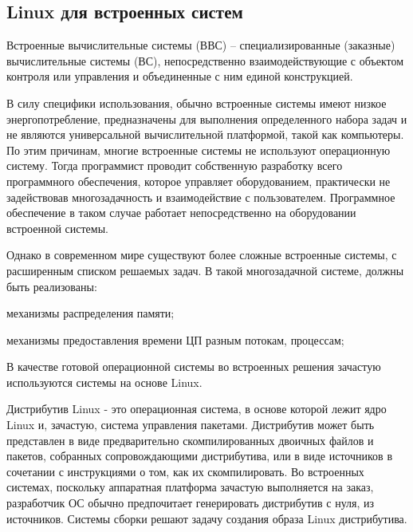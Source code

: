 \subsection{Linux для встроенных систем}
\label{subsec:linux-for-embedded-systems}

Встроенные вычислительные системы (ВВС) – специализированные (заказные) вычислительные системы (ВС), непосредственно взаимодействующие с объектом контроля или управления и объединенные с ним единой конструкцией.

В силу специфики использования, обычно встроенные системы имеют низкое энергопотребление, предназначены для выполнения определенного набора задач и не являются универсальной вычислительной платформой, такой как компьютеры. По этим причинам, многие встроенные системы не используют операционную систему. Тогда программист проводит собственную разработку всего программного обеспечения, которое управляет оборудованием, практически не задействовав многозадачность и взаимодействие с пользователем. Программное обеспечение в таком случае работает непосредственно на оборудовании встроенной системы. \cite{EMBEDDED}
 
Однако в современном мире существуют более сложные встроенные системы, с расширенным списком решаемых задач.
В такой многозадачной системе, должны быть реализованы:
\begin{dashitemize}
  \item механизмы распределения памяти;
  \item механизмы предоставления времени ЦП разным потокам, процессам;
\end{dashitemize}

В качестве готовой операционной системы во встроенных решения зачастую используются системы на основе Linux. 

Дистрибутив Linux - это операционная система, в основе которой лежит ядро Linux и, зачастую, система управления пакетами. Дистрибутив может быть представлен в виде предварительно скомпилированных двоичных файлов и пакетов, собранных сопровождающими дистрибутива, или в виде источников в сочетании с инструкциями о том, как их скомпилировать. Во встроенных системах, поскольку аппаратная платформа зачастую выполняется на заказ, разработчик ОС обычно предпочитает генерировать дистрибутив с нуля, из источников.
Системы сборки решают задачу создания образа Linux дистрибутива.
